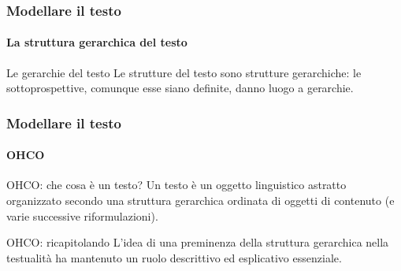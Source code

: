 \begin{frame}
	\frametitle{Modellare il testo}
	\framesubtitle{La struttura gerarchica del testo}
	\addtocounter{nframe}{1}

	\begin{block}{Le gerarchie del testo}
		Le strutture del testo sono strutture gerarchiche: le sottoprospettive, comunque esse siano definite, danno luogo a gerarchie.
	\end{block}
\end{frame}

%

\begin{frame}
	\frametitle{Modellare il testo}
	\framesubtitle{OHCO}
	\addtocounter{nframe}{1}

	\begin{block}{OHCO: che cosa è un testo?}
		 Un testo è un oggetto linguistico astratto organizzato secondo una struttura gerarchica ordinata di oggetti di contenuto (e varie successive riformulazioni). 
	\end{block}

	\begin{block}{OHCO: ricapitolando}
		L’idea di una preminenza della struttura gerarchica nella testualità ha mantenuto un ruolo descrittivo ed esplicativo essenziale.
	\end{block}
	
\end{frame}

%

